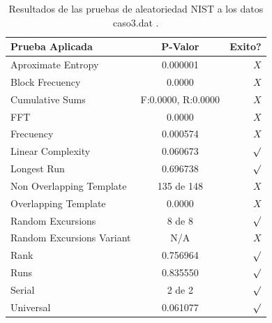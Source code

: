 \documentclass[10pt]{IEEEtran}
\begin{document}
\begin{table}[H]
\caption{Resultados de las pruebas de aleatoriedad NIST a los datos caso3.dat .}
\label{caso1}
\begin{center}
\begin{small}
\begin{tabular}{|l|c|r|}
\hline

Prueba Aplicada &  P-Valor & Exito? \\
\hline

Aproximate Entropy    &    0.000001 & $X$ \\

Block Frecuency  & 0.0000  &  $X$  \\

Cumulative Sums    &   F:0.0000, R:0.0000    & $X$ \\

FFT    &   0.0000 &   $X$      \\

Frecuency     &  0.000574 &  $X$   \\

Linear Complexity      & 0.060673  & $\surd$ \\

Longest Run      &   0.696738 &    $\surd$      \\

Non Overlapping Template      & 135 de 148    &     $X$          \\

Overlapping Template      &  0.0000 &       $X$        \\

Random Excursions      & 8 de 8  &    $\surd$      \\

Random Excursions Variant & N/A &     $X$    \\

Rank &  0.756964 &      $\surd$      \\

Runs &      0.835550  &     $\surd$        \\

Serial &     2 de 2    &     $\surd$        \\

Universal &       0.061077  &   $\surd$            \\

\hline

\end{tabular}
\end{small}
\end{center}
\end{table}
\end{document}
